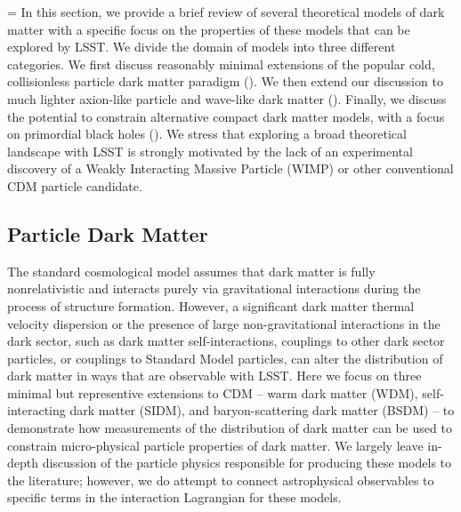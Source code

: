 =
In this section, we provide a brief review of several theoretical models of dark matter with a specific focus on the properties of these models that can be explored by LSST. 
We divide the domain of models into three different categories. 
We first discuss reasonably minimal extensions of the popular cold, collisionless particle dark matter paradigm (). 
We then extend our discussion to much lighter axion-like particle and wave-like dark matter (). 
Finally, we discuss the potential to constrain alternative compact dark matter models, with a focus on primordial black holes ().
We stress that exploring a broad theoretical landscape with LSST is strongly motivated by the lack of an experimental discovery of a Weakly Interacting Massive Particle (WIMP) or other conventional CDM particle candidate. 

\subsection{Particle Dark Matter }
\label{sec:particles}


The standard \LCDM cosmological model assumes that dark matter is fully nonrelativistic and interacts purely via gravitational interactions during the process of structure formation. However, a significant dark matter thermal velocity dispersion or the presence of large non-gravitational interactions in the dark sector, such as dark matter self-interactions, couplings to other dark sector particles, or couplings to Standard Model particles, can alter the distribution of dark matter in ways that are observable with LSST. Here we focus on three minimal but representive extensions to CDM -- warm dark matter (WDM), self-interacting dark matter (SIDM), and baryon-scattering dark matter (BSDM) --  to demonstrate how measurements of the distribution of dark matter can be used to constrain micro-physical particle properties of dark matter. We largely leave in-depth discussion of the particle physics responsible for producing these models to the literature; however, we do attempt to connect astrophysical observables to specific terms in the interaction Lagrangian for these models.



